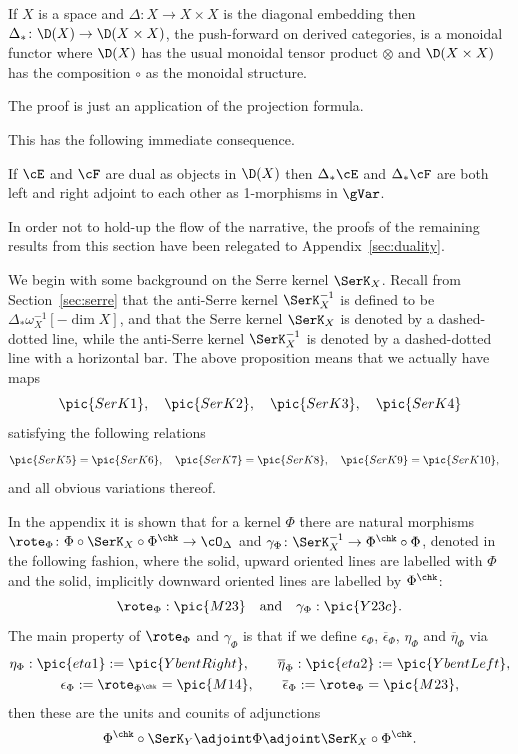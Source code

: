 \begin{Proposition}\label{prop:deltalstar}
  If $X$ is a space and $\Delta\colon X\to X\times X$ is the diagonal
  embedding then $\Delta_*\colon \D(X)\to \D(X\times X)$, the
  push-forward on derived categories, is a monoidal functor where
  $\D(X)$ has the usual monoidal tensor product $\otimes$ and
  $\D(X\times X)$ has the composition $\circ$ as the monoidal
  structure.
\end{Proposition}

\begin{Proof}
The proof is just an application of the projection formula.
\end{Proof}

\noindent This has the following immediate consequence.

\begin{Lemma}
  If $\cE$ and $\cF$ are dual as objects in $\D(X)$ then $\Delta_*\cE$
  and $\Delta_*\cF$ are both left and right adjoint to each other as
  1-morphisms in $\gVar$.
\end{Lemma}


In order not to hold-up the flow of the narrative, the proofs of the
remaining results from this section have been relegated to
Appendix~\ref{sec:duality}.

 We begin with some background on the
Serre kernel $\SerK_X$.
Recall from Section~\ref{sec:serre} that the anti-Serre kernel
$\SerK^{-1}_X$ is defined to be $\Delta_*\omega^{-1}_X[-\dim X]$, and
that the Serre kernel $\SerK_X$ is denoted by a dashed-dotted line,
while the anti-Serre kernel $\SerK^{-1}_X$ is denoted by a
dashed-dotted line with a horizontal bar.  The above proposition means
that we actually have maps
\[\pic{SerK1},\quad
\pic{SerK2},\quad
\pic{SerK3},\quad
\pic{SerK4}
\]
satisfying the following relations
\[\pic{SerK5}=\pic{SerK6},\quad
\pic{SerK7}=\pic{SerK8},\quad
\pic{SerK9}=\pic{SerK10},\quad
\]
and all obvious variations thereof.


In the appendix it is shown that for a kernel $\Phi$ there are natural
morphisms $\rote_\Phi\colon \Phi\circ\SerK_X\circ\Phi^\chk\to \cO_\Delta$
and $\gamma_\Phi\colon \SerK_X^{-1}\to \Phi^\chk\circ \Phi$, denoted in the
following fashion, where the solid, upward oriented lines are labelled
with $\Phi$ and the solid, implicitly downward oriented lines are
labelled by $\Phi^\chk$:
\[\rote_\Phi:\pic{M23}\quad \text{and}\quad \gamma_\Phi:\pic{Y23c}.\]
The main property of $\rote_\Phi$ and $\gamma_\Phi$ is that if we define
$\epsilon_\Phi$, $\overline \epsilon_\Phi$, $\eta_\Phi$ and
$\overline\eta_\Phi$ via
\begin{gather*}
 \eta_\Phi: \pic{eta1}:=\pic{YbentRight},\qquad
\overline\eta_\Phi: \pic{eta2}:=\pic{YbentLeft},\\
\epsilon_\Phi:=\rote_{\Phi^\chk}=\pic{M14},\qquad
\overline\epsilon_\Phi:=\rote_{\Phi}=\pic{M23},
\end{gather*}
then these are the units and counits of adjunctions
\[\Phi^\chk\circ\SerK_Y\adjoint\Phi\adjoint \SerK_X\circ
\Phi^\chk.\]

